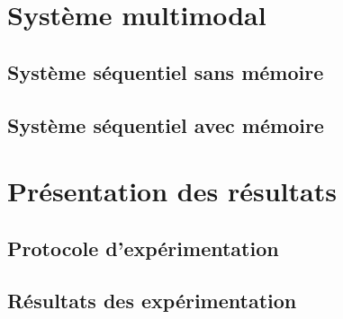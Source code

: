 \section{Système multimodal}
\subsection{Système séquentiel sans mémoire}
\subsection{Système séquentiel avec mémoire}

\section{Présentation des résultats}
\subsection{Protocole d’expérimentation}
\subsection{Résultats des expérimentation}

